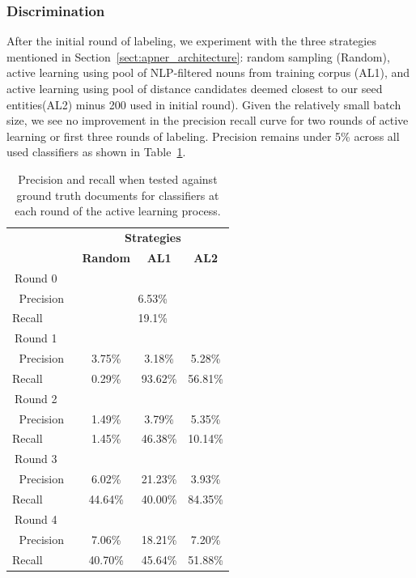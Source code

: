 \subsubsection{Discrimination}
After the initial round of labeling, we experiment with the three strategies mentioned in Section~\ref{sect:apner_architecture}: random sampling (Random), active learning using pool of NLP-filtered nouns from training corpus (AL1), and active learning using pool of  distance candidates deemed closest to our seed entities(AL2) \textemdash minus 200 used in initial round).
Given the relatively small batch size, we see no improvement in the precision recall curve for two rounds of active learning or first three rounds of labeling. 
Precision remains under 5\% across all used classifiers as shown in Table~\ref{tab:prtable}. 



\begin{table}[ht!]
\centering
\caption{Precision and recall when tested against ground truth documents for classifiers at each round of the active learning process.\label{tab:prtable}
}
\vspace{2ex}
\setlength\tabcolsep{3pt}
\begin{tabular}{|c|c|c|c|}
\hline
& \multicolumn{3}{c|}{\textbf{Strategies}} \\
 & \textbf{Random} & \textbf{AL1}  & \textbf{AL2}  \\
\hline
Round 0\ \ & \multicolumn{3}{c|}{} \\
\hline
Precision &        \multicolumn{3}{c|}{6.53\%} \\
Recall\ \ \ \ \ &               \multicolumn{3}{c|}{19.1\%} \\
\hline
Round 1\ \  & \multicolumn{3}{c|}{} \\
\hline
Precision     & 3.75\%       &      3.18\%      &  5.28\% \\
Recall\ \ \ \ \ & 0.29\%      &   93.62\%     &  56.81\% \\
\hline
Round 2\ \  & \multicolumn{3}{c|}{} \\
\hline
Precision      & 1.49\%           &      3.79\%      &  5.35\% \\
Recall\ \ \ \ \ & 1.45\%           &    46.38\%      &  10.14\% \\
\hline
Round 3\ \  & \multicolumn{3}{c|}{} \\
\hline
Precision      & 6.02\%              &    21.23\%      &  3.93\% \\
Recall\ \ \ \ \ & 44.64\%            &    40.00\%      &  84.35\%  \\
\hline
Round 4\ \  & \multicolumn{3}{c|}{} \\
\hline
Precision     & 7.06\%          &    18.21\%      &  7.20\% \\
Recall\ \ \ \ \ & 40.70\%         &     45.64\%     &  51.88\% \\
\hline
\end{tabular}
\end{table}


